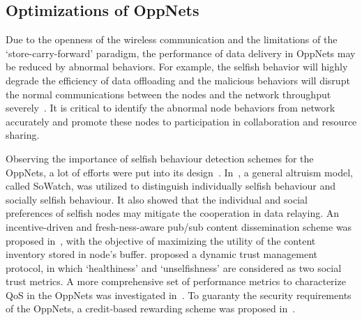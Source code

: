\subsection{Optimizations of OppNets}
Due to the openness of
the wireless communication and the limitations of the
`store-carry-forward' paradigm,
the performance of data delivery in OppNets may be reduced
by abnormal behaviors.
For example,
the selfish behavior will highly degrade
the efficiency of data offloading
and the malicious behaviors
will disrupt the
normal communications between the nodes and the network
throughput severely~\cite{DBLP:journals/comsur/JedariXN18}.
It is critical to
identify the abnormal node behaviors from
network accurately and promote these nodes to
participation in collaboration and resource sharing.

Observing the importance of selfish behaviour detection
schemes for the OppNets,
a lot of efforts were
put into its design~\cite{DBLP:journals/fgcs/JedariXCDTA19, Zhou2015Incentive, Chen2014Dynamic, DBLP:journals/tdsc/ChoC18, Wang2016A}.
In~\cite{DBLP:journals/fgcs/JedariXCDTA19},
a general altruism model,
called SoWatch,
was utilized to 
distinguish individually selfish behaviour and socially selfish behaviour.
It also showed that the individual and social preferences of selfish nodes
may mitigate the cooperation in data relaying.
An incentive-driven and fresh-ness-aware pub/sub content dissemination scheme
was proposed in~\cite{Zhou2015Incentive},
with the objective of maximizing the utility of the content inventory stored in node's buffer.
\cite{Chen2014Dynamic} proposed a dynamic trust management protocol,
in which `healthiness' and
`unselfishness' are considered as two social trust metrics. 
A more comprehensive set of performance metrics to characterize QoS in the OppNets
was investigated in~\cite{DBLP:journals/tdsc/ChoC18}.
To guaranty the security requirements of the OppNets,
a credit-based
rewarding scheme was proposed in~\cite{Wang2016A}.

